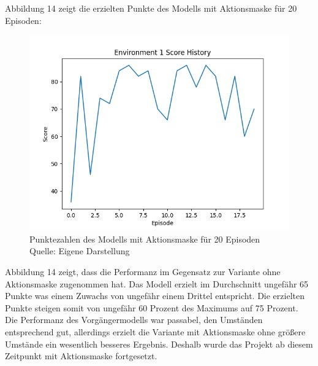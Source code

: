 Abbildung 14 zeigt die erzielten Punkte des Modells mit Aktionsmaske für 20 Episoden:
\nopagebreak
\begin{figure}[H]
	\includegraphics[width=1\textwidth]{Bilder/trainingwithactionmask} 
	\caption[Punktezahlen des Modells mit Aktionsmaske für 20 Episoden]{Punktezahlen des Modells mit Aktionsmaske für 20 Episoden\\ Quelle: Eigene Darstellung}
\end{figure}

Abbildung 14 zeigt, dass die Performanz im Gegensatz zur Variante ohne Aktionsmaske zugenommen hat. Das Modell erzielt im Durchschnitt ungefähr 65 Punkte was einem Zuwachs von ungefähr einem Drittel entspricht. Die erzielten Punkte steigen somit von ungefähr 60 Prozent des Maximums auf 75 Prozent. Die Performanz des Vorgängermodells war passabel, den Umständen entsprechend gut, allerdings erzielt die Variante mit Aktionsmaske ohne größere Umstände ein wesentlich besseres Ergebnis. Deshalb wurde das Projekt ab diesem Zeitpunkt mit Aktionsmaske fortgesetzt.
